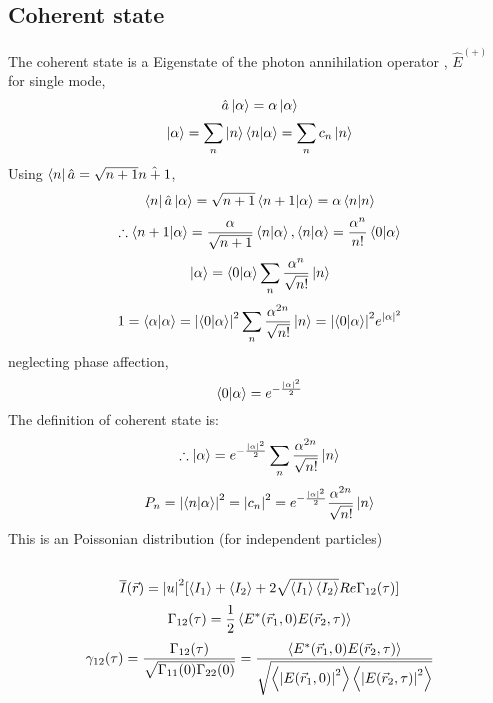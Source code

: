 \documentclass[9pt]{article}
\begin{document}
\subsection{Coherent state}
The coherent state is a Eigenstate of the photon annihilation operator , $ \hat{E}^{(+)} $ \\
for single mode,
\begin{equation*}
    \hat{a}\ket{\alpha}=\alpha\ket{\alpha}
\end{equation*}
\begin{equation*}
    \ket{\alpha}=\sum_n\ket{n}\braket{n}{\alpha}=\sum_n c_n\ket{n}
\end{equation*}
Using $\bra{n}\hat{a}=\sqrt{n+1}\hat{n+1} $,
\begin{equation*}
    \bra{n}\hat{a}\ket{\alpha}=\sqrt{n+1}\bra{n+1}\ket{\alpha}=\alpha\bra{n}\ket{n}
\end{equation*}
\begin{equation*}
\therefore \bra{n+1}\ket{\alpha}=\frac{\alpha}{\sqrt{n+1}}\braket{n}{\alpha},\braket{n}{\alpha}=\frac{\alpha^n}{n!}\braket{0}{\alpha}
\end{equation*}
\begin{equation*}
    \ket{\alpha}=\braket{0}{\alpha}\sum_n \frac{\alpha^n}{\sqrt{n!}}\ket{n}
\end{equation*}
\begin{equation*}
    1=\braket{\alpha}{\alpha} = \abs{\braket{0}{\alpha}}^2\sum_n\frac{\alpha^{2n}}{\sqrt{n!}}\ket{n}=\abs{\braket{0}{\alpha}}^2 e^{\abs{\alpha}^2}
\end{equation*}
neglecting phase affection,
\begin{equation*}
    \braket{0}{\alpha}=e^{-\frac{\abs{\alpha}^2}{2}}
\end{equation*}
The definition of coherent state is:
\begin{equation*}
    \therefore \ket{\alpha}=e^{-\frac{\abs{\alpha}^2}{2}}\sum_n\frac{\alpha^{2n}}{\sqrt{n!}}\ket{n}
\end{equation*}
\begin{equation*}
    P_n=\abs{\braket{n}{\alpha}}^2=\abs{c_n}^2=e^{-\frac{\abs{\alpha}^2}{2}}\frac{\alpha^{2n}}{\sqrt{n!}}\ket{n}
\end{equation*}
This is an Poissonian distribution (for independent particles)
\subsection{}
\begin{equation*}
    \overline{I}(\vec{r})=\abs{u}^2[\ev{I_1}+\ev{I_2}+2\sqrt{\ev{I_1}\ev{I_2}}Re\Gamma_{12}(\tau)]
\end{equation*}
\begin{equation*}
    \Gamma_{12}(\tau)=\frac{1}{2}\ev{E^*(\vec{r}_1,0)E(\vec{r}_2,\tau)}
\end{equation*}
\begin{equation*}
    \gamma_{12}(\tau)=\frac{\Gamma_{12}(\tau)}{\sqrt{\Gamma_{11}(0)\Gamma_{22}(0)}}
    =\frac{\ev{E^*(\vec{r}_1,0)E(\vec{r}_2,\tau)}}{\sqrt{\ev{\abs{E(\vec{r}_1,0)}^2}\ev{\abs{E(\vec{r}_2,\tau)}^2}}}
\end{equation*}
\end{document}
